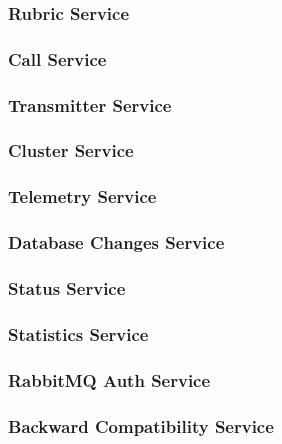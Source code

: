 \subsubsection{Rubric Service}
\label{internalprog:microservices:overview:rubric}

\subsubsection{Call Service}
\label{internalprog:microservices:call}

\subsubsection{Transmitter Service}
\label{internalprog:microservices:transmitter}

\subsubsection{Cluster Service}
\label{internalprog:microservices:overview:cluster}

\subsubsection{Telemetry Service}
\label{internalprog:microservices:overview:telemetry}

\subsubsection{Database Changes Service}
\label{internalprog:microservices:overview:databasechanges}

\subsubsection{Status Service}
\label{internalprog:microservices:overview:status}

\subsubsection{Statistics Service}
\label{internalprog:microservices:overview:statistics}

\subsubsection{RabbitMQ Auth Service}
\label{internalprog:microservices:overview:rabbitmqauth}

\subsubsection{Backward Compatibility Service}
\label{internalprog:microservices:overview:backwardcompatibility}

